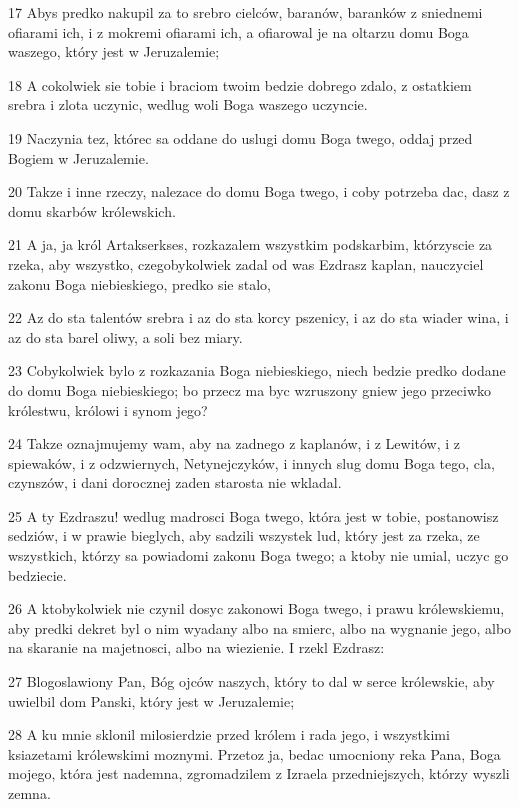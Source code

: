 \par 17 Abys predko nakupil za to srebro cielców, baranów, baranków z sniednemi ofiarami ich, i z mokremi ofiarami ich, a ofiarowal je na oltarzu domu Boga waszego, który jest w Jeruzalemie;
\par 18 A cokolwiek sie tobie i braciom twoim bedzie dobrego zdalo, z ostatkiem srebra i zlota uczynic, wedlug woli Boga waszego uczyncie.
\par 19 Naczynia tez, którec sa oddane do uslugi domu Boga twego, oddaj przed Bogiem w Jeruzalemie.
\par 20 Takze i inne rzeczy, nalezace do domu Boga twego, i coby potrzeba dac, dasz z domu skarbów królewskich.
\par 21 A ja, ja król Artakserkses, rozkazalem wszystkim podskarbim, którzyscie za rzeka, aby wszystko, czegobykolwiek zadal od was Ezdrasz kaplan, nauczyciel zakonu Boga niebieskiego, predko sie stalo,
\par 22 Az do sta talentów srebra i az do sta korcy pszenicy, i az do sta wiader wina, i az do sta barel oliwy, a soli bez miary.
\par 23 Cobykolwiek bylo z rozkazania Boga niebieskiego, niech bedzie predko dodane do domu Boga niebieskiego; bo przecz ma byc wzruszony gniew jego przeciwko królestwu, królowi i synom jego?
\par 24 Takze oznajmujemy wam, aby na zadnego z kaplanów, i z Lewitów, i z spiewaków, i z odzwiernych, Netynejczyków, i innych slug domu Boga tego, cla, czynszów, i dani dorocznej zaden starosta nie wkladal.
\par 25 A ty Ezdraszu! wedlug madrosci Boga twego, która jest w tobie, postanowisz sedziów, i w prawie bieglych, aby sadzili wszystek lud, który jest za rzeka, ze wszystkich, którzy sa powiadomi zakonu Boga twego; a ktoby nie umial, uczyc go bedziecie.
\par 26 A ktobykolwiek nie czynil dosyc zakonowi Boga twego, i prawu królewskiemu, aby predki dekret byl o nim wyadany albo na smierc, albo na wygnanie jego, albo na skaranie na majetnosci, albo na wiezienie. I rzekl Ezdrasz:
\par 27 Blogoslawiony Pan, Bóg ojców naszych, który to dal w serce królewskie, aby uwielbil dom Panski, który jest w Jeruzalemie;
\par 28 A ku mnie sklonil milosierdzie przed królem i rada jego, i wszystkimi ksiazetami królewskimi moznymi. Przetoz ja, bedac umocniony reka Pana, Boga mojego, która jest nademna, zgromadzilem z Izraela przedniejszych, którzy wyszli zemna.

